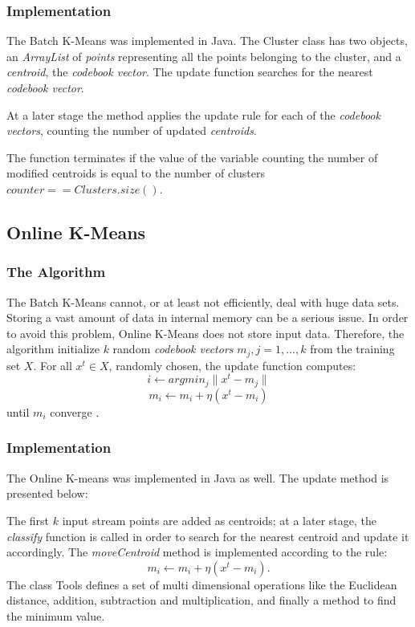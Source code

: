 \documentclass{lmproj}
\begin{document}
\subsubsection{Implementation}
The Batch K-Means was implemented in Java. The Cluster class has two objects, an \textit{ArrayList} of \textit{points} representing all the points belonging to the cluster, and a \textit{centroid}, the \textit{codebook vector}.
The update function searches for the nearest \textit{codebook vector}.

At a later stage the method applies the update rule for each of the \textit{codebook vectors}, counting the number of updated \textit{centroids}.

The function terminates if the value of the variable counting the number of modified centroids is equal to the number of clusters $counter == Clusters.size()$.


\subsection{Online K-Means}
\subsubsection{The Algorithm}
The Batch K-Means cannot, or at least not efficiently, deal with huge data sets. Storing a vast amount of data in internal memory can be a serious issue. In order to avoid this problem, Online K-Means does not store input data. Therefore, the algorithm initialize $k$ random \textit{codebook vectors} $m_j,j=1,...,k$ from the training set $X$. For all $x^t \in X$, randomly chosen, the update function computes:  
\begin{equation}
i \longleftarrow arg min_j \parallel x^t - m_j \parallel
\end{equation}
\begin{equation}
m_i \longleftarrow m_i + \eta (x^t - m_i)
\end{equation}
until $m_i$ converge \cite{Clustering}.

\subsubsection{Implementation}
The Online K-means was implemented in Java as well. The update method is presented below:

The first $k$ input stream points are added as centroids; at a later stage, the \textit{classify} function is called in order to search for the nearest centroid and update it accordingly.
The \textit{moveCentroid} method is implemented according to the rule: 
\begin{equation}
m_i \longleftarrow m_i + \eta (x^t - m_i).
\end{equation}
The class Tools defines a set of multi dimensional operations like the Euclidean distance, addition, subtraction and multiplication, and finally a method to find the minimum value. 

\end{document}
